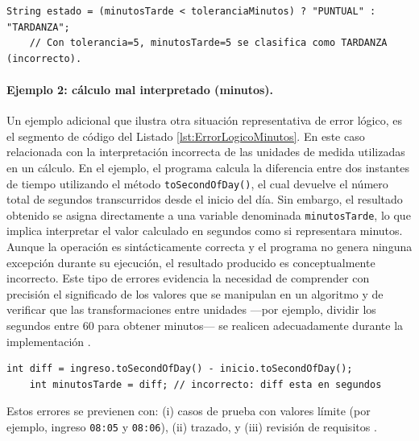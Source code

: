 \documentclass[12pt,twoside]{book}
\begin{document}
						\begin{lstlisting}[style=Java,caption={Error lógico: condición incorrecta.},label={lst:ErrorLogicoCondicion}]
	String estado = (minutosTarde < toleranciaMinutos) ? "PUNTUAL" : "TARDANZA";
	// Con tolerancia=5, minutosTarde=5 se clasifica como TARDANZA (incorrecto). \end{lstlisting}
						
						\paragraph{Ejemplo 2: cálculo mal interpretado (minutos).} Un ejemplo adicional que ilustra otra situación representativa de error lógico, es el segmento de código del Listado \ref{lst:ErrorLogicoMinutos}. En este caso relacionada con la interpretación incorrecta de las unidades de medida utilizadas en un cálculo. En el ejemplo, el programa calcula la diferencia entre dos instantes de tiempo utilizando el método \texttt{toSecondOfDay()}, el cual devuelve el número total de segundos transcurridos desde el inicio del día. Sin embargo, el resultado obtenido se asigna directamente a una variable denominada \texttt{minutosTarde}, lo que implica interpretar el valor calculado en segundos como si representara minutos. Aunque la operación es sintácticamente correcta y el programa no genera ninguna excepción durante su ejecución, el resultado producido es conceptualmente incorrecto. Este tipo de errores evidencia la necesidad de comprender con precisión el significado de los valores que se manipulan en un algoritmo y de verificar que las transformaciones entre unidades —por ejemplo, dividir los segundos entre 60 para obtener minutos— se realicen adecuadamente durante la implementación \cite{Deitel2025Java,Sommerville2015Software}.
						
						\begin{lstlisting}[style=Java,caption={Error lógico: no convertir segundos a minutos.},label={lst:ErrorLogicoMinutos}]
	int diff = ingreso.toSecondOfDay() - inicio.toSecondOfDay();
	int minutosTarde = diff; // incorrecto: diff esta en segundos \end{lstlisting}
						
						\noindent
						Estos errores se previenen con: (i) casos de prueba con valores límite (por ejemplo, ingreso \texttt{08:05} y \texttt{08:06}), (ii) trazado, y (iii) revisión de requisitos \cite{ISOIECIEEE2018Requirements,Gaddis2022Starting}.
						
\end{document}

